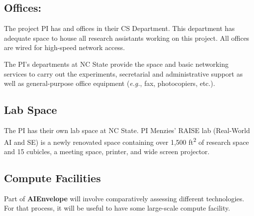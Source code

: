 \documentclass[twoside]{NSF}
\newcommand{\IT}{{\sffamily  \textbf{AIEnvelope}}}
\begin{document}
\begin{nsffacilities}
  



 
\subsection*{Offices:}
The project PI has
and offices in their   CS Department. This department
has adequate space to house all research assistants
working on this project. All offices are wired for high-speed network access.

The PI's departments at  NC State provide the space and basic networking services to
carry out the experiments, secretarial and administrative support as well as general-purpose office equipment ({\em e.g.}, fax, photocopiers, etc.).

\subsection*{Lab Space}
The PI has their own lab space at NC State.
PI  Menzies' RAISE lab (Real-World 
AI and SE) is a newly renovated space containing over 1,500 ft\textsuperscript{2} of research space and 
15 cubicles, a meeting space, printer, and wide screen projector. 

\subsection*{Compute Facilities}
Part of {\IT} will involve comparatively assessing different technologies. For that process, it will be useful to have some large-scale compute facility.
 

\end{nsffacilities}
\end{document}
